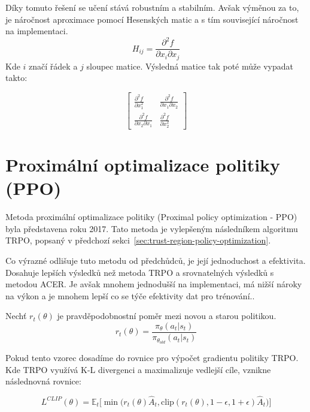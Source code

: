 Díky tomuto řešení se učení stává robustním a stabilním.
Avšak výměnou za to, je náročnost aproximace pomocí Hesenských matic a s tím související náročnost na implementaci.
\begin{equation}
  H_{ij} = \frac{\partial^2 f}{\partial x_i \partial x_j}
\end{equation}
Kde $i$ značí řádek a $j$ sloupec matice.
Výsledná matice tak poté může vypadat takto:

\begin{equation}
  \begin{bmatrix}
      \frac{\partial^2 f}{\partial x_1^2} & \frac{\partial^2 f}{\partial x_1 \partial x_2} \\
      \frac{\partial^2 f}{\partial x_2 \partial x_1} & \frac{\partial^2 f}{\partial x_2^2}
    \end{bmatrix}
\end{equation}

\section{Proximální optimalizace politiky (PPO)}
\label{sec:proximalni-optimalizace-politiky}


Metoda proximální optimalizace politiky (Proximal policy optimization - PPO) byla představena roku 2017\cite{PPO_paper}.
Tato metoda je vylepšeným následníkem algoritmu TRPO, popsaný v předchozí sekci~\ref{sec:trust-region-policy-optimization}.

Co výrazné odlišuje tuto metodu od předchůdců, je její jednoduchost a efektivita.
Dosahuje lepších výsledků než metoda TRPO a srovnatelných výsledků s metodou ACER.
Je avšak mnohem jednodušší na implementaci, má nižší nároky na výkon a je mnohem lepší co se týče efektivity dat pro trénování.\cite{PPO_paper}.

Nechť $r_t(\theta)$ je pravděpodobnostní poměr mezi novou a starou politikou.
\begin{equation}
  r_t(\theta) = \frac{\pi_\theta(a_t \vert s_t)}{\pi_{\theta_{old}}(a_t \vert s_t)}
\end{equation}

Pokud tento vzorec dosadíme do rovnice pro výpočet gradientu politiky TRPO. Kde TRPO využívá K-L divergenci a maximalizuje vedlejší cíle, vznikne následnovná rovnice:

\begin{equation}
  L^{CLIP}(\theta) = \mathbb{E}_t \Big[ \min \Big( r_t(\theta) \hat{A}_t, \text{clip}(r_t(\theta), 1-\epsilon, 1+\epsilon) \hat{A}_t \Big) \Big]
\end{equation}

